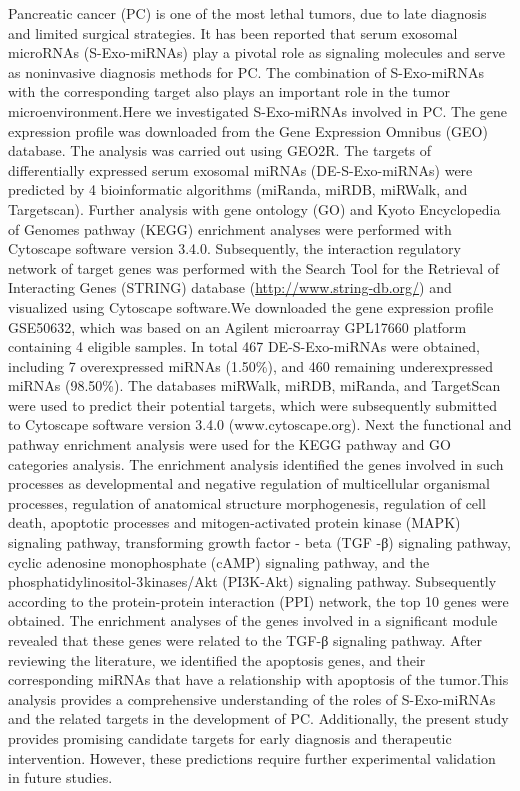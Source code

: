 \documentclass[]{article}
\begin{document}
Pancreatic cancer (PC) is one of the most lethal tumors, due to late
diagnosis and limited surgical strategies. It has been reported that
serum exosomal microRNAs (S-Exo-miRNAs) play a pivotal role as signaling
molecules and serve as noninvasive diagnosis methods for PC. The
combination of S-Exo-miRNAs with the corresponding target also plays an
important role in the tumor microenvironment.Here we investigated
S-Exo-miRNAs involved in PC. The gene expression profile was downloaded
from the Gene Expression Omnibus (GEO) database. The analysis was
carried out using GEO2R. The targets of differentially expressed serum
exosomal miRNAs (DE-S-Exo-miRNAs) were predicted by 4 bioinformatic
algorithms (miRanda, miRDB, miRWalk, and Targetscan). Further analysis
with gene ontology (GO) and Kyoto Encyclopedia of Genomes pathway (KEGG)
enrichment analyses were performed with Cytoscape software version
3.4.0. Subsequently, the interaction regulatory network of target genes
was performed with the Search Tool for the Retrieval of Interacting
Genes (STRING) database (\url{http://www.string-db.org/}) and visualized
using Cytoscape software.We downloaded the gene expression profile
GSE50632, which was based on an Agilent microarray GPL17660 platform
containing 4 eligible samples. In total 467 DE-S-Exo-miRNAs were
obtained, including 7 overexpressed miRNAs (1.50\%), and 460 remaining
underexpressed miRNAs (98.50\%). The databases miRWalk, miRDB, miRanda,
and TargetScan were used to predict their potential targets, which were
subsequently submitted to Cytoscape software version 3.4.0
(www.cytoscape.org). Next the functional and pathway enrichment analysis
were used for the KEGG pathway and GO categories analysis. The
enrichment analysis identified the genes involved in such processes as
developmental and negative regulation of multicellular organismal
processes, regulation of anatomical structure morphogenesis, regulation
of cell death, apoptotic processes and mitogen-activated protein kinase
(MAPK) signaling pathway, transforming growth factor - beta (TGF -β)
signaling pathway, cyclic adenosine monophosphate (cAMP) signaling
pathway, and the phosphatidylinositol-3 kinases/Akt (PI3K-Akt) signaling
pathway. Subsequently according to the protein-protein interaction (PPI)
network, the top 10 genes were obtained. The enrichment analyses of the
genes involved in a significant module revealed that these genes were
related to the TGF-β signaling pathway. After reviewing the literature,
we identified the apoptosis genes, and their corresponding miRNAs that
have a relationship with apoptosis of the tumor.This analysis provides a
comprehensive understanding of the roles of S-Exo-miRNAs and the related
targets in the development of PC. Additionally, the present study
provides promising candidate targets for early diagnosis and therapeutic
intervention. However, these predictions require further experimental
validation in future studies.
\end{document}
